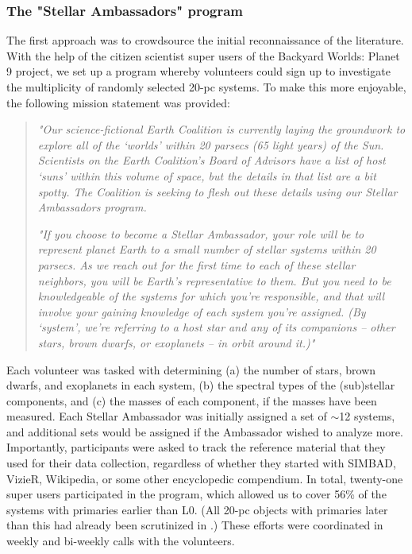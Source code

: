 \documentclass[twocolumn,tighten,twocolappendix]{aastex631}
\begin{document}
\subsubsection{The "Stellar Ambassadors" program}

The first approach was to crowdsource the initial reconnaissance of the literature. With the help of the citizen scientist super users of the Backyard Worlds: Planet 9 project, we set up a program whereby volunteers could sign up to investigate the multiplicity of randomly selected 20-pc systems. To make this more enjoyable, the following mission statement was provided:

\begin{quote}
    
{\it "Our science-fictional Earth Coalition is currently laying the groundwork to explore all of the `worlds' within 20 parsecs (65 light years) of the Sun. Scientists on the Earth Coalition's Board of Advisors have a list of host `suns' within this volume of space, but the details in that list are a bit spotty. The Coalition is seeking to flesh out these details using our Stellar Ambassadors program.}

{\it "If you choose to become a Stellar Ambassador, your role will be to represent planet Earth to a small number of stellar systems within 20 parsecs. As we reach out for the first time to each of these stellar neighbors, you will be Earth's representative to them. But you need to be knowledgeable of the systems for which you're responsible, and that will involve your gaining knowledge of each system you're assigned. (By `system', we're referring to a host star and any of its companions -- other stars, brown dwarfs, or exoplanets -- in orbit around it.)"}

\end{quote} 

Each volunteer was tasked with determining (a) the number of stars, brown dwarfs, and exoplanets in each system, (b) the spectral types of the (sub)stellar components, and (c) the masses of each component, if the masses have been measured. Each Stellar Ambassador was initially assigned a set of $\sim$12 systems, and additional sets would be assigned if the Ambassador wished to analyze more. Importantly, participants were asked to track the reference material that they used for their data collection, regardless of whether they started with SIMBAD, VizieR, Wikipedia, or some other encyclopedic compendium. In total, twenty-one super users participated in the program, which allowed us to cover 56\% of the systems with primaries earlier than L0. (All 20-pc objects with primaries later than this had already been scrutinized in \citealt{kirkpatrick2021}.) These efforts were coordinated in weekly and bi-weekly calls with the volunteers.
\end{document}
